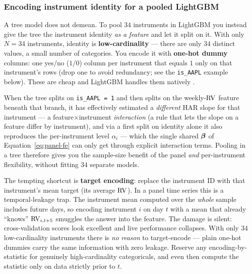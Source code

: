 \subsubsection*{Encoding instrument identity for a pooled LightGBM}

A tree model does not demean.  To pool $34$ instruments in LightGBM you instead
give the tree the instrument identity \emph{as a feature} and let it split on it.
With only $N = 34$ instruments, identity is \textbf{low-cardinality} --- there are
only $34$ distinct values, a small number of categories.  You encode it with
\textbf{one-hot dummy} columns: one yes/no ($1$/$0$) column per instrument that
equals $1$ only on that instrument's rows (drop one to avoid redundancy; see the
\texttt{is\_AAPL} example below).  These are cheap and LightGBM handles them
natively \citep{Ke2017}.

\begin{keyidea}
When the tree splits on \texttt{is\_AAPL = 1} and then splits on the weekly-$\operatorname{RV}$
feature beneath that branch, it has effectively estimated a \emph{different} HAR
slope for that instrument --- a feature$\times$instrument \emph{interaction} (a
rule that lets the slope on a feature differ by instrument), and via a first split
on identity alone it also reproduces the per-instrument level $\alpha_i$ --- which
the single shared $\bm{\beta}$ of Equation~\eqref{eq:panel-fe} can only get through
explicit interaction terms.  Pooling in a tree therefore gives you the
sample-size benefit of the panel \emph{and} per-instrument flexibility, without
fitting $34$ separate models.
\end{keyidea}

\begin{warning}
The tempting shortcut is \textbf{target encoding}: replace the instrument ID with
that instrument's mean target (its average $\operatorname{RV}$).  In a panel time series this
is a temporal-leakage trap.  The instrument mean computed over the \emph{whole}
sample includes future days, so encoding instrument $i$ on day $t$ with a mean
that already ``knows'' $\operatorname{RV}_{i,t+5}$ smuggles the answer into the feature.  The
damage is silent: cross-validation scores look excellent and live performance
collapses.  With only $34$ low-cardinality instruments there is \emph{no reason}
to target-encode --- plain one-hot dummies carry the same information with zero
leakage.  Reserve any encoding-by-statistic for genuinely high-cardinality
categoricals, and even then compute the statistic only on data strictly prior to
$t$.
\end{warning}

